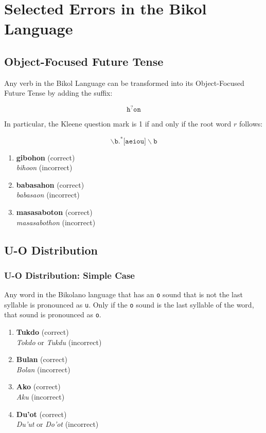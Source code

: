 \section{Selected Errors in the Bikol Language}
\subsection{Object-Focused Future Tense}
Any verb in the Bikol Language can be transformed into its Object-Focused Future Tense by adding the suffix:

\[
      \texttt{h}^?\texttt{on}
\]

In particular, the Kleene question mark is 1 if and only if the root word $r$ follows:

\[
      \backslash\texttt{b.}^*\texttt{[aeiou]}\backslash\texttt{b}
\]

\begin{example}
\end{example}

\begin{enumerate}
      \item \textbf{gibohon} (correct) \\
            \textit{bihoon} (incorrect)
      \item \textbf{babasahon} (correct) \\
            \textit{babasaon} (incorrect)
      \item \textbf{masasaboton} (correct) \\
            \textit{masasabothon} (incorrect)
\end{enumerate}

\subsection{U-O Distribution}
\label{uo_distribution}
\subsubsection{U-O Distribution: Simple Case}
Any word in the Bikolano language that has an \texttt{o} sound that is not the last syllable is pronounced as \texttt{u}. Only if the \texttt{o} sound is the last syllable of the word, that sound is pronounced as \texttt{o}.

\begin{example}
\end{example}

\begin{enumerate}
      \item \textbf{Tukdo} (correct) \\
            \textit{Tokdo} or \textit{Tukdu} (incorrect) 
      \item \textbf{Bulan} (correct) \\
            \textit{Bolan} (incorrect) 
      \item \textbf{Ako} (correct) \\
            \textit{Aku} (incorrect) 
      \item \textbf{Du'ot} (correct) \\
            \textit{Du'ut} or \textit{Do'ot} (incorrect) 
\end{enumerate}

